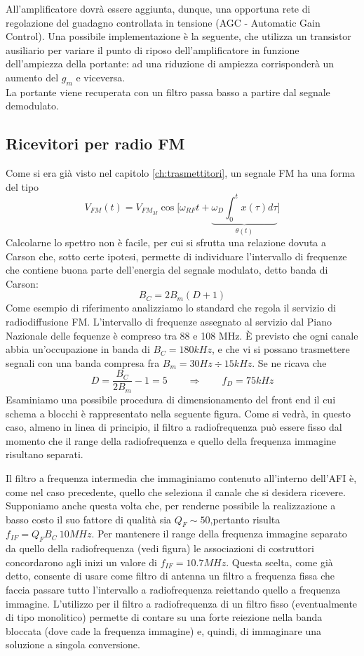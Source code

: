 All'amplificatore dovrà essere aggiunta, dunque, una opportuna rete di regolazione del guadagno controllata in tensione (AGC - Automatic Gain Control). Una possibile implementazione è la seguente, che utilizza un transistor ausiliario per variare il punto di riposo dell'amplificatore in funzione dell'ampiezza della portante: ad una riduzione di ampiezza corrisponderà un aumento del $g_m$ e viceversa.
\\
La portante viene recuperata con un filtro passa basso a partire dal segnale demodulato.


\subsection{Ricevitori per radio FM}
Come si era già visto nel capitolo \ref{ch:trasmettitori}, un segnale FM ha una forma del tipo
\[
V_{FM}(t) = V_{FM_M} \cos \bigg[ \omega_{RF}t
+\underbrace{\omega_D \int_{0}^{t}x(\tau) d \tau}_\text{$\theta(t)$} \bigg]
\]
Calcolarne lo spettro non è facile, per cui si sfrutta una relazione dovuta a Carson che, sotto certe ipotesi, permette di individuare l'intervallo di frequenze che contiene buona parte dell'energia del segnale modulato, detto banda di Carson:
\[
B_C = 2B_m(D+1)
\]
Come esempio di riferimento analizziamo lo standard che regola il servizio di radiodiffusione FM. L'intervallo di frequenze assegnato al servizio dal Piano Nazionale delle fequenze è compreso tra 88 e 108 MHz. È previsto che ogni canale abbia un'occupazione in banda di $B_C = 180kHz$, e che vi si possano trasmettere segnali con una banda compresa fra $B_m = 30Hz\div15kHz$. Se ne ricava che
\[
D = \frac{B_C}{2B_m} -1=  5
\qquad\Rightarrow\qquad
f_D = 75kHz
\]
Esaminiamo una possibile procedura di dimensionamento del front end il cui schema a blocchi è rappresentato nella seguente figura. Come si vedrà, in questo caso, almeno in linea di principio, il filtro a radiofrequenza può essere fisso dal momento che il range della radiofrequenza e quello della frequenza immagine risultano separati.

Il filtro a frequenza intermedia che immaginiamo contenuto all'interno dell'AFI è, come nel caso precedente, quello che seleziona il canale che si desidera ricevere. Supponiamo anche questa volta che, per renderne possibile la realizzazione a basso costo il suo fattore di qualità sia $Q_F \sim 50$,pertanto risulta $f_{IF} = Q_F B_C ~ 10MHz$.
Per mantenere il range della frequenza immagine separato da quello della radiofrequenza (vedi figura) le associazioni di costruttori concordarono agli inizi un valore di $f_{IF} = 10.7MHz$.
Questa scelta, come già detto, consente di usare come filtro di antenna un filtro a frequenza fissa che faccia passare tutto l'intervallo a radiofrequenza reiettando quello a frequenza immagine.
L'utilizzo per il filtro a radiofrequenza di un filtro fisso (eventualmente di tipo monolitico) permette
di contare su una forte reiezione nella banda bloccata (dove cade la frequenza immagine) e, quindi,
di immaginare una soluzione a singola conversione.

